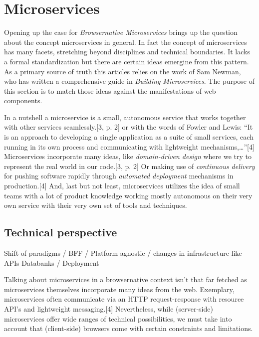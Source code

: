 \documentclass[]{assets/latex/ieee}
\begin{document}
\section{Microservices}\label{microservices-1}

Opening up the case for \emph{Browsernative Microservices} brings up the
question about the concept microservices in general. In fact the concept
of microservices has many facets, stretching beyond disciplines and
technical boundaries. It lacks a formal standardization but there are
certain ideas emergine from this pattern. As a primary source of truth
this articles relies on the work of Sam Newman, who has written a
comprehensive guide in \emph{Building Microservices}. The purpose of
this section is to match those ideas against the manifestations of web
components.

In a nutshell a microservice is a small, autonomous service that works
together with other services seamlessly.{[}3, p. 2{]} or with the words
of Fowler and Lewis: ``It is an approach to developing a single
application as a suite of small services, each running in its own
process and communicating with lightweight mechanisms,\ldots{}''{[}4{]}
Microservices incorporate many ideas, like \emph{domain-driven design}
where we try to represent the real world in our code.{[}3, p. 2{]} Or
making use of \emph{continuous delivery} for pushing software rapidly
through \emph{automated deployment} mechanisms in production.{[}4{]}
And, last but not least, microservices utilizes the idea of small teams
with a lot of product knowledge working mostly autonomous on their very
own service with their very own set of tools and techniques.

\subsection{Technical perspective}\label{technical-perspective}

Shift of paradigms / BFF / Platform agnostic / changes in infrastructure
like APIs Databanks / Deployment

Talking about microservices in a browsernative context isn't that far
fetched as microservices themselves incorporate many ideas from the web.
Exemplary, microservices often communicate via an HTTP request-response
with resource API's and lightweight messaging.{[}4{]} Nevertheless,
while (server-side) microservices offer wide ranges of technical
possibilities, we must take into account that (client-side) browsers
come with certain constraints and limitations.
\end{document}
